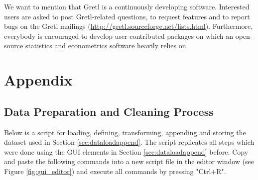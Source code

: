 \documentclass[11pt]{article}
\newcommand{\remph}[1]{{\color{myred}#1}}
\begin{document}
We want to mention that Gretl is a continuously developing software. Interested users are asked to post Gretl-related questions, to request features and to report bugs on the Gretl mailings (\url{http://gretl.sourceforge.net/lists.html}). Furthermore, everybody is encouraged to develop user-contributed packages on which an open-source statistics and econometrics software heavily relies on.





\newpage

\appendix
\setcounter{table}{0}
\renewcommand{\thetable}{A\arabic{table}}
\setcounter{figure}{0}
\renewcommand{\thefigure}{A\arabic{figure}}

\section{Appendix}




\subsection{Data Preparation and Cleaning Process}
\label{sec:datapre}
Below is a script for loading, defining, transforming, appending and storing the dataset used in Section \ref{sec:dataloadappend}. The script replicates all steps which were done using the GUI elements in Section \ref{sec:dataloadappend} before. Copy and paste the following commands into a new script file in the editor window (see Figure \ref{fig:gui_editor}) and execute all commands by pressing "Ctrl+R".
\end{document}
